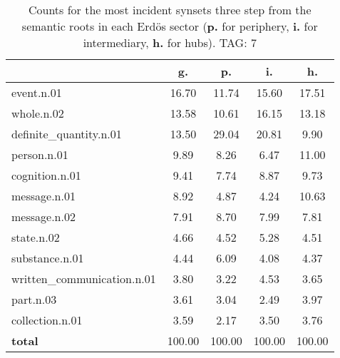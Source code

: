 \begin{table}[h!]
\begin{center}
\begin{tabular}{| l | c | c | c | c |}\hline
 & g. & p. & i. & h. \\\hline
event.n.01 & 16.70  & 11.74  & 15.60  & 17.51 \\\hline
whole.n.02 & 13.58  & 10.61  & 16.15  & 13.18 \\\hline
definite\_quantity.n.01 & 13.50  & 29.04  & 20.81  & 9.90 \\\hline
person.n.01 & 9.89  & 8.26  & 6.47  & 11.00 \\\hline
cognition.n.01 & 9.41  & 7.74  & 8.87  & 9.73 \\\hline
message.n.01 & 8.92  & 4.87  & 4.24  & 10.63 \\\hline
message.n.02 & 7.91  & 8.70  & 7.99  & 7.81 \\\hline
state.n.02 & 4.66  & 4.52  & 5.28  & 4.51 \\\hline
substance.n.01 & 4.44  & 6.09  & 4.08  & 4.37 \\\hline
written\_communication.n.01 & 3.80  & 3.22  & 4.53  & 3.65 \\\hline
part.n.03 & 3.61  & 3.04  & 2.49  & 3.97 \\\hline
collection.n.01 & 3.59  & 2.17  & 3.50  & 3.76 \\\hline
{{\bf total}} & 100.00  & 100.00  & 100.00  & 100.00 \\\hline
\end{tabular}
\caption{Counts for the most incident synsets three step from the semantic roots in each Erd\"os sector ({\bf p.} for periphery, {\bf i.} for intermediary, {\bf h.} for hubs). TAG: 7}
\end{center}
\end{table}
